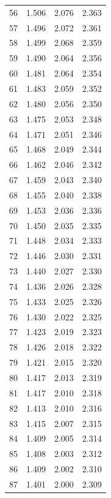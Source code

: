 \documentclass[12pt]{article}
\begin{document}
\begin{center}
\begin{tabular}{|l || l| l| l|}
            56 & 1.506 & 2.076 & 2.363 \\
            57 & 1.496 & 2.072 & 2.361 \\
            58 & 1.499 & 2.068 & 2.359 \\
            59 & 1.490 & 2.064 & 2.356 \\
            60 & 1.481 & 2.064 & 2.354 \\
            61 & 1.483 & 2.059 & 2.352 \\
            62 & 1.480 & 2.056 & 2.350 \\
            63 & 1.475 & 2.053 & 2.348 \\
            64 & 1.471 & 2.051 & 2.346 \\
            65 & 1.468 & 2.049 & 2.344 \\
            66 & 1.462 & 2.046 & 2.342 \\
            67 & 1.459 & 2.043 & 2.340 \\
            68 & 1.455 & 2.040 & 2.338 \\
            69 & 1.453 & 2.036 & 2.336 \\
            70 & 1.450 & 2.035 & 2.335 \\
            71 & 1.448 & 2.034 & 2.333 \\
            72 & 1.446 & 2.030 & 2.331 \\
            73 & 1.440 & 2.027 & 2.330 \\
            74 & 1.436 & 2.026 & 2.328 \\
            75 & 1.433 & 2.025 & 2.326 \\
            76 & 1.430 & 2.022 & 2.325 \\
            77 & 1.423 & 2.019 & 2.323 \\
            78 & 1.426 & 2.018 & 2.322 \\
            79 & 1.421 & 2.015 & 2.320 \\
            80 & 1.417 & 2.013 & 2.319 \\
            81 & 1.417 & 2.010 & 2.318 \\
            82 & 1.413 & 2.010 & 2.316 \\
            83 & 1.415 & 2.007 & 2.315 \\
            84 & 1.409 & 2.005 & 2.314 \\
            85 & 1.408 & 2.003 & 2.312 \\
            86 & 1.409 & 2.002 & 2.310 \\
            87 & 1.401 & 2.000 & 2.309 \\

\end{tabular}
\end{center}
\end{document}

